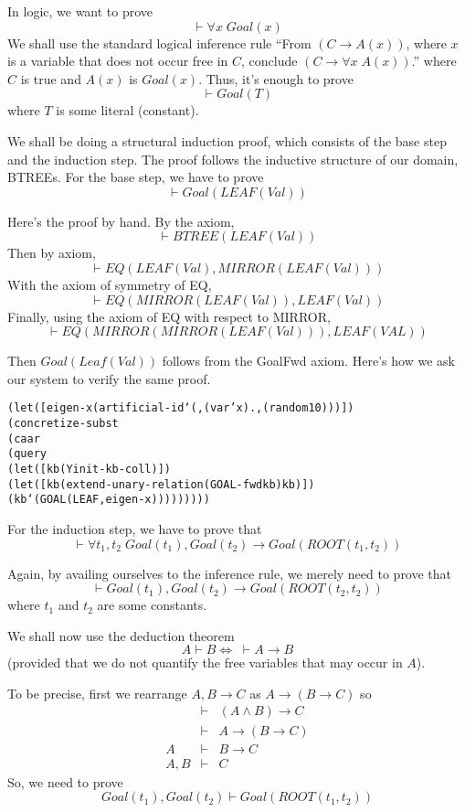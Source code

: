 In logic, we want to prove
	$$\vdash \forall x \; Goal(x)$$
We shall use the standard logical inference rule
``From $(C \rightarrow A(x))$, where $x$ is a variable that does not occur free in $C$,
conclude $(C \rightarrow \forall x \; A(x))$.''
where $C$ is true and $A(x)$ is $Goal(x)$. Thus, it's enough to prove
$$\vdash Goal(T)$$
where $T$ is some literal (constant).

We shall be doing a structural induction proof, which consists of the base
step and the induction step.  The proof follows the inductive structure of
our domain, BTREEs. For the base step, we have to prove $$\vdash
Goal(LEAF(Val))$$

Here's the proof by hand.  By the axiom,
$$\vdash BTREE(LEAF(Val))$$
Then by axiom,
$$\vdash EQ(LEAF(Val), MIRROR(LEAF(Val)))$$
With the axiom of symmetry of EQ,
$$\vdash EQ(MIRROR(LEAF(Val)), LEAF(Val))$$
Finally, using the axiom of EQ with respect to MIRROR,
$$\vdash EQ(MIRROR(MIRROR(LEAF(Val))), LEAF(VAL))$$

Then $Goal(Leaf(Val))$ follows from the GoalFwd axiom.  Here's how we ask
our system to verify the same proof.

\begin{alltt}
(let ([eigen-x (artificial-id `(,(var 'x) . ,(random 10)))])
  (concretize-subst
    (caar
      (query
	(let ([kb (Y init-kb-coll)])
	  (let ([kb (extend-unary-relation (GOAL-fwd kb) kb)])
	    (kb `(GOAL (LEAF ,eigen-x)))))))))
\end{alltt}

For the induction step, we have to prove that $$\vdash \forall t_{1}, t_{2} \;
Goal(t_{1}), Goal(t_{2}) \rightarrow Goal(ROOT(t_{1},t_{2}))$$

\noindent Again, by availing ourselves to the inference rule, we
merely need to prove that
$$\vdash Goal(t_{1}), Goal(t_{2}) \rightarrow Goal(ROOT(t_{2},t_{2}))$$
where $t_1$ and $t_2$ are some constants.

We shall now use the deduction theorem
$$A \vdash B  \Longleftrightarrow \; \vdash A \rightarrow B$$
(provided that we do not quantify the free variables that may occur in
$A$).

To be precise, first we rearrange $A,B \rightarrow C$
as $A \rightarrow (B \rightarrow C)$
so
\begin{eqnarray*}
	&\vdash& (A \wedge B) \rightarrow C\\
	&\vdash& A \rightarrow (B \rightarrow C)\\
      A &\vdash& B \rightarrow C\\
     A,B&\vdash& C
\end{eqnarray*}
So, we need to prove
$$Goal(t_{1}), Goal(t_{2}) \vdash Goal(ROOT(t_{1},t_{2}))$$

